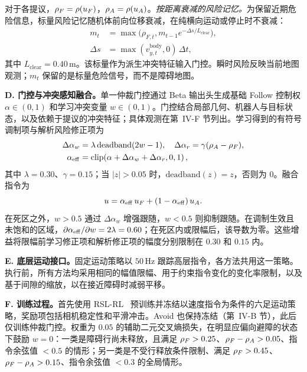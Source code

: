 对于各提议，$\rho_F=\rho(u_{F})$，$\rho_A=\rho(u_{A})$。\emph{按距离衰减的风险记忆。}为保留近期危险信息，标量风险记忆随机体前向位移衰减，在纯横向运动或停止时不衰减：
\begin{equation}
\begin{aligned}
m_t &= \max\!\big(\rho_{F,t},m_{t-1}e^{-\Delta s/L_{\mathrm{clear}}}\big),\\
\Delta s &= \max(v_{y,t}^{\mathrm{body}},0)\,\Delta t,
\end{aligned}
\end{equation}
其中 $L_{\mathrm{clear}}=0.40\,\mathrm{m}$。该标量作为派生冲突特征输入门控。瞬时风险反映当前地图观测；$m_t$ 保留的是标量危险信号，而不是障碍地图。

\textbf{D. 门控与冲突感知融合。}单一仲裁门控通过 Beta 输出头生成基础 Follow 控制权 $\alpha\in(0,1)$ 和学习冲突变量 $w\in(0,1)$。门控结合局部几何、机器人与目标状态，以及依赖于提议的冲突特征；具体观测在第~IV-F 节列出。学习得到的有符号调制项与解析风险修正项为
\begin{align}
\Delta\alpha_w &= \lambda\,\mathrm{deadband}(2w-1),\quad
\Delta\alpha_r = \gamma(\rho_A-\rho_F), \\
\alpha_{\mathrm{eff}} &= \mathrm{clip}\!\left(\alpha+\Delta\alpha_w+\Delta\alpha_r,0,1\right),
\end{align}
其中 $\lambda=0.30$、$\gamma=0.15$；当 $|z|>0.05$ 时，$\mathrm{deadband}(z)=z$，否则为 $0$。融合指令为
\begin{equation}
u = \alpha_{\mathrm{eff}}\,u_{F} + (1-\alpha_{\mathrm{eff}})\,u_{A}.
\label{eq:fusion}
\end{equation}
在死区之外，$w>0.5$ 通过 $\Delta\alpha_w$ 增强跟随，$w<0.5$ 则抑制跟随。在调制生效且未饱和的区域，$\partial\alpha_{\mathrm{eff}}/\partial w=2\lambda=0.60$；在死区内或限幅后，该导数为零。这些增益将限幅前学习修正项和解析修正项的幅度分别限制在 $0.30$ 和 $0.15$ 内。

\textbf{E. 底层运动接口。}固定运动策略以 $50\,\mathrm{Hz}$ 跟踪高层指令，各方法共用这一策略。执行前，所有方法均采用相同的幅值限幅、用于约束指令变化的变化率限制，以及基于间隙的缩放，以在接近障碍时减弱平移。

\textbf{F. 训练过程。}首先使用 RSL-RL~\cite{ref:rudin} 预训练并冻结以速度指令为条件的六足运动策略，奖励项包括相机稳定性和平滑冲击。Avoid 也保持冻结（第~IV-B 节），此后仅训练仲裁门控。权重为 $0.05$ 的辅助二元交叉熵损失，在明显应偏向避障的状态下鼓励 $w=0$：一类是障碍行尚未释放，且满足 $\rho_F>0.25$、$\rho_F-\rho_A>0.05$、指令余弦值 $<0.5$ 的情形；另一类是不受行释放条件限制、满足 $\rho_F>0.45$、$\rho_F-\rho_A>0.15$、指令余弦值 $<0.3$ 的全局情形。

